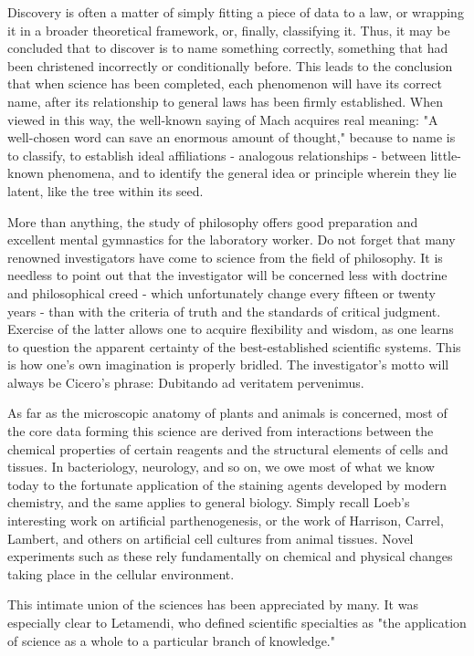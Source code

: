 \documentclass{article}
\begin{document}
Discovery is often a matter of simply fitting a piece of data to a law, or wrapping it in a broader theoretical framework, or, finally, classifying it. Thus, it may be concluded that to discover is to name something correctly, something that had been christened incorrectly or conditionally before. This leads to the conclusion that when science has been completed, each phenomenon will have its correct name, after its relationship to general laws has been firmly established. When viewed in this way, the well-known saying of Mach acquires real meaning: "A well-chosen word can save an enormous amount of thought," because to name is to classify, to establish ideal affiliations - analogous relationships - between little-known phenomena, and to identify the general idea or principle wherein they lie latent, like the tree within its seed.

More than anything, the study of philosophy offers good preparation and excellent mental gymnastics for the laboratory worker. Do not forget that many renowned investigators have come to science from the field of philosophy. It is needless to point out that the investigator will be concerned less with doctrine and philosophical creed - which unfortunately change every fifteen or twenty years - than with the criteria of truth and the standards of critical judgment. Exercise of the latter allows one to acquire flexibility and wisdom, as one learns to question the apparent certainty of the best-established scientific systems. This is how one’s own imagination is properly bridled. The investigator’s motto will always be Cicero’s phrase: Dubitando ad veritatem pervenimus.

As far as the microscopic anatomy of plants and animals is concerned, most of the core data forming this science are derived from interactions between the chemical properties of certain reagents and the structural elements of cells and tissues. In bacteriology, neurology, and so on, we owe most of what we know today to the fortunate application of the staining agents developed by modern chemistry, and the same applies to general biology. Simply recall Loeb’s interesting work on artificial parthenogenesis, or the work of Harrison, Carrel, Lambert, and others on artificial cell cultures from animal tissues. Novel experiments such as these rely fundamentally on chemical and physical changes taking place in the cellular environment.

This intimate union of the sciences has been appreciated by many. It was especially clear to Letamendi, who defined scientific specialties as "the application of science as a whole to a particular branch of knowledge."
\end{document}
